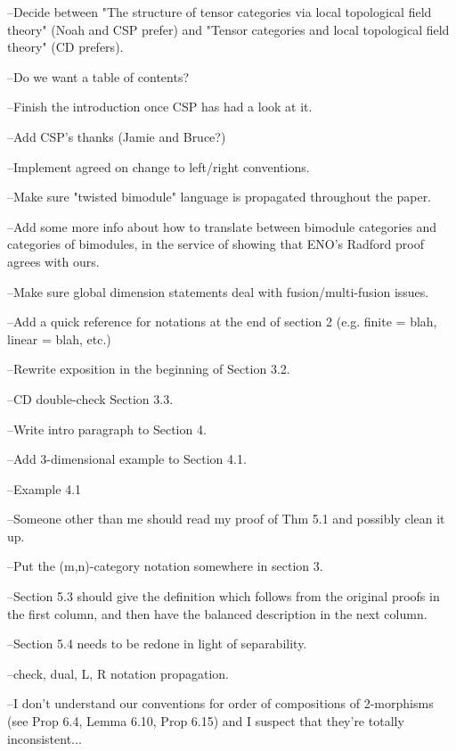 --Decide between "The structure of tensor categories via local topological field theory" (Noah and CSP prefer) and "Tensor categories and local topological field theory" (CD prefers).

--Do we want a table of contents?

--Finish the introduction once CSP has had a look at it.

--Add CSP's thanks (Jamie and Bruce?)

--Implement agreed on change to left/right conventions.

--Make sure "twisted bimodule" language is propagated throughout the paper.

--Add some more info about how to translate between bimodule categories and categories of bimodules, in the service of showing that ENO's Radford proof agrees with ours.

--Make sure global dimension statements deal with fusion/multi-fusion issues.

--Add a quick reference for notations at the end of section 2 (e.g. finite = blah, linear = blah, etc.)

--Rewrite exposition in the beginning of Section 3.2.

--CD double-check Section 3.3.

--Write intro paragraph to Section 4.

--Add 3-dimensional example to Section 4.1.

--Example 4.1

--Someone other than me should read my proof of Thm 5.1 and possibly clean it up.

--Put the (m,n)-category notation somewhere in section 3.

--Section 5.3 should give the definition which follows from the original proofs in the first column, and then have the balanced description in the next column.

--Section 5.4 needs to be redone in light of separability.

--check, dual, L, R notation propagation.

--I don't understand our conventions for order of compositions of 2-morphisms (see Prop 6.4, Lemma 6.10, Prop 6.15) and I suspect that they're totally inconsistent...
